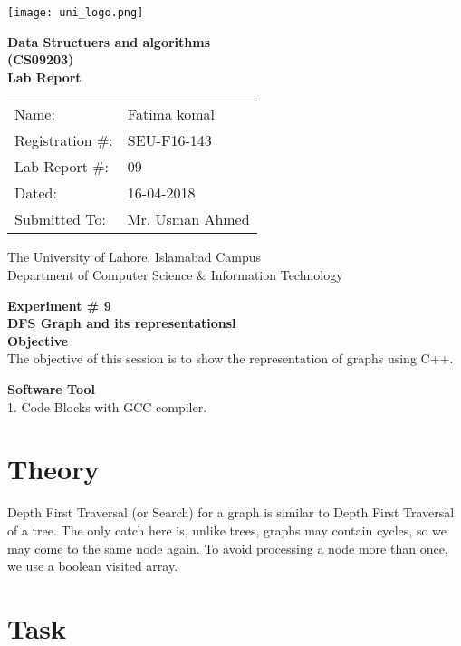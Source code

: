 \documentclass[11pt]{article}            %
\begin{document}
\begin{titlepage}
    \centering
  \vfill
    \texttt{[image: uni\_logo.png]} \\ 
	\vskip2cm
    {\bfseries\Large
	Data Structuers and algorithms \\ (CS09203)\\
	
	\vskip2cm
	Lab Report 
	 
	\vskip2cm
	}    

\begin{center}
\begin{tabular}{ l l  } 

Name: & Fatima komal \\ 
Registration \#: & SEU-F16-143 \\ 
Lab Report \#: & 09 \\ 
 Dated:& 16-04-2018\\ 
Submitted To:& Mr. Usman Ahmed\\ 

\end{tabular}
\end{center}
    \vfill
    The University of Lahore, Islamabad Campus\\
Department of Computer Science \& Information Technology
\end{titlepage}


    
    {\bfseries\Large
\centering
	Experiment \# 9 \\

DFS Graph and its representationsl \\
	
	}    
 \vskip1cm
 \textbf {Objective}\\ The objective of this session is to show the representation of graphs using C++. 
 
 \textbf {Software Tool} \\
 1. Code Blocks with GCC compiler.

\section{Theory }              

Depth First Traversal (or Search) for a graph is similar to Depth First Traversal of a tree. The only catch here is, unlike trees, graphs may contain cycles, so we may come to the same node again. To avoid processing a node more than once, we use a boolean visited array.
\section{Task}  
\end{document}
